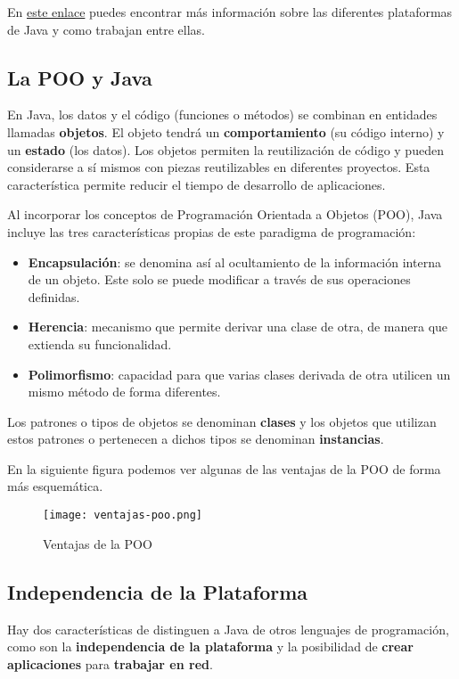 En \href{https://www.campusmvp.es/recursos/post/Descifrando-Java-lenguaje-plataforma-ediciones-implementaciones.aspx}{este enlace} puedes encontrar más información sobre las diferentes plataformas de Java y como trabajan entre ellas.

\subsection{La POO y Java}
En Java, los datos y el código (funciones o métodos) se combinan en entidades llamadas \textbf{objetos}. El objeto tendrá un \textbf{comportamiento} (su código interno) y un \textbf{estado} (los datos). Los objetos permiten la reutilización de código y pueden considerarse a sí mismos con piezas reutilizables en diferentes proyectos. Esta característica permite reducir el tiempo de desarrollo de aplicaciones.

Al incorporar los conceptos de Programación Orientada a Objetos (POO), Java incluye las tres características propias de este paradigma de programación:

\begin{itemize}
    \item \textbf{Encapsulación}: se denomina así al ocultamiento de la información interna de un objeto. Este solo se puede modificar a través de sus operaciones definidas.
    \item \textbf{Herencia}: mecanismo que permite derivar una clase de otra, de manera que extienda su funcionalidad.
    \item \textbf{Polimorfismo}: capacidad para que varias clases derivada de otra utilicen un mismo método de forma diferentes.
\end{itemize}

Los patrones o tipos de objetos se denominan \textbf{clases} y los objetos que utilizan estos patrones o pertenecen a dichos tipos se denominan \textbf{instancias}.

En la siguiente figura podemos ver algunas de las ventajas de la POO de forma más esquemática.

\begin{figure}[H]
    \centering
    \texttt{[image: ventajas-poo.png]}
    \caption{Ventajas de la POO}
\end{figure}

\subsection{Independencia de la Plataforma}
Hay dos características de distinguen a Java de otros lenguajes de programación, como son la \textbf{independencia de la plataforma} y la posibilidad de \textbf{crear aplicaciones} para \textbf{trabajar en red}.

